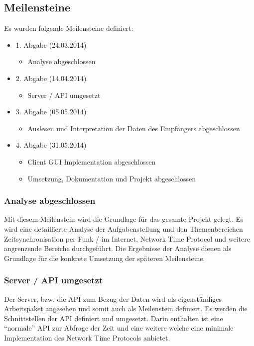 \subsection{Meilensteine}
Es wurden folgende Meilensteine definiert:

\begin{itemize}
\item 1. Abgabe (24.03.2014)
	\begin{itemize}
	\item Analyse abgeschlossen
	\end{itemize}
\item 2. Abgabe (14.04.2014)
	\begin{itemize}
	\item Server / API umgesetzt
	\end{itemize}
\item 3. Abgabe (05.05.2014)
	\begin{itemize}
	\item Auslesen und Interpretation der Daten des Empfängers abgeschlossen
	\end{itemize}
\item 4. Abgabe (31.05.2014)
	\begin{itemize}
	\item Client GUI Implementation abgeschlossen
	\item Umsetzung, Dokumentation und Projekt abgeschlossen
	\end{itemize}
\end{itemize}

\subsubsection{Analyse abgeschlossen}
Mit diesem Meilenstein wird die Grundlage für das gesamte Projekt gelegt. Es wird eine detaillierte Analyse der Aufgabenstellung und den Themenbereichen Zeitsynchronisation per Funk / im Internet, Network Time Protocol und weitere angrenzende Bereiche durchgeführt. Die Ergebnisse der Analyse dienen als Grundlage für die konkrete Umsetzung der späteren Meilensteine.

\subsubsection{Server / API umgesetzt}
Der Server, bzw. die API zum Bezug der Daten wird als eigenständiges Arbeitspaket angesehen und somit auch als Meilenstein definiert. Es werden die Schnittstellen der API definiert und umgesetzt. Darin enthalten ist eine "`normale"' API zur Abfrage der Zeit und eine weitere welche eine minimale Implementation des Network Time Protocols anbietet.

